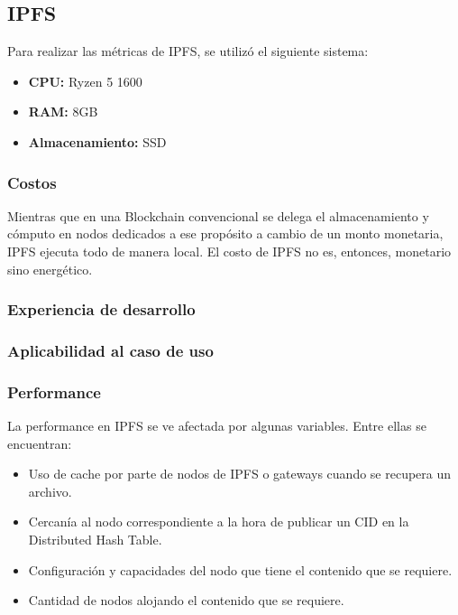 \subsection{IPFS}

Para realizar las métricas de IPFS, se utilizó el siguiente sistema:
\begin{itemize}
    \item \textbf{CPU:} Ryzen 5 1600
    \item \textbf{RAM:} 8GB
    \item \textbf{Almacenamiento:} SSD
\end{itemize}

\subsubsection{Costos}

Mientras que en una Blockchain convencional se delega el almacenamiento y cómputo en nodos dedicados a ese propósito a cambio de un monto monetaria, IPFS ejecuta todo de manera local. El costo de IPFS no es, entonces, monetario sino energético.

\subsubsection{Experiencia de desarrollo} %

\subsubsection{Aplicabilidad al caso de uso}

\subsubsection{Performance}

La performance en IPFS se ve afectada por algunas variables. Entre ellas se encuentran:

\begin{itemize}
    \item Uso de cache por parte de nodos de IPFS o gateways cuando se recupera un archivo.
    \item Cercanía al nodo correspondiente a la hora de publicar un CID en la Distributed Hash Table.
    \item Configuración y capacidades del nodo que tiene el contenido que se requiere.
    \item Cantidad de nodos alojando el contenido que se requiere.
\end{itemize}

